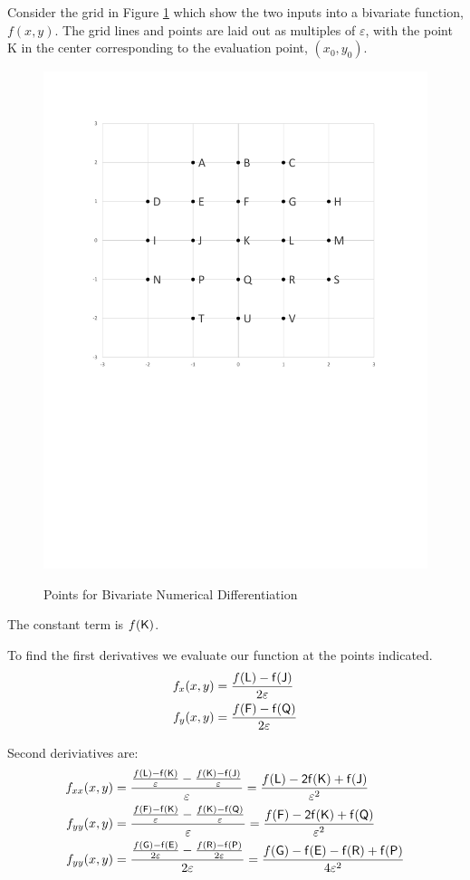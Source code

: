 \documentclass[letterpaper,12pt]{article}
\newcommand{\ve}{\varepsilon}
\theoremstyle{definition}
\begin{document}
\begin{spacing}{1.5}
		Consider the grid in Figure \ref{Perturb_Grid_fig} which show the two inputs into a bivariate function, $f(x,y)$.  The grid lines and points are laid out as multiples of $\ve$, with the point {\sf K} in the center corresponding to the evaluation point, $(x_0,y_0)$.
		\begin{figure}[ht]
			\centering
			\caption{Points for Bivariate Numerical Differentiation}
			\vspace{-3 mm}
			\includegraphics[width=.6\textwidth]{Perturb_Grid_fig.pdf}
			\label{Perturb_Grid_fig}
		\end{figure}

		The constant term is $f(\sf K)$.

		To find the first derivatives we evaluate our function at the points indicated.
		\begin{align}
			f_x(x,y) & = \frac{f(\sf L)-f(\sf J)}{2\ve} \nonumber \\
			f_y(x,y) & = \frac{f(\sf F)-f(\sf Q)}{2\ve} \nonumber
		\end{align}

		Second deriviatives are:
		\begin{align}
			f_{xx}(x,y) & = \frac{\frac{f(\sf L)-f(\sf K)}{\ve} - \frac{f(\sf K)-f(\sf J)}{\ve}}{\ve} = \frac{f(\sf L)-2f(\sf K)+f(\sf J)}{\ve^2} \nonumber \\
			f_{yy}(x,y) & = \frac{\frac{f(\sf F)-f(\sf K)}{\ve} - \frac{f(\sf K)-f(\sf Q)}{\ve}}{\ve} = \frac{f(\sf F)-2f(\sf K)+f(\sf Q)}{\ve^2} \nonumber \\
			f_{yy}(x,y) & = \frac{\frac{f(\sf G)-f(\sf E)}{2\ve} - \frac{f(\sf R)-f(\sf P)}{2\ve}}{2\ve} = \frac{f(\sf G)-f(\sf E)-f(\sf R)+f(\sf P)}{4\ve^2} \nonumber
		\end{align}


\end{spacing}
\end{document}
